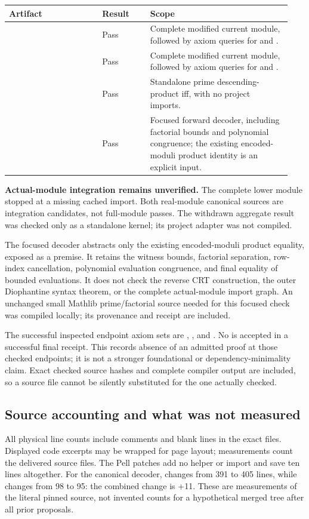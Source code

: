 \begin{longtable}{@{}L{0.31\linewidth}L{0.16\linewidth}L{0.47\linewidth}@{}}
\toprule
Artifact & Result & Scope \\
\midrule
\endhead
{} & Pass & Complete modified current module, followed by axiom queries for  and . \\
 & Pass & Complete modified current module, followed by axiom queries for  and . \\
 & Pass & Standalone prime descending-product iff, with no project imports. \\
 & Pass & Focused forward decoder, including factorial bounds and polynomial congruence; the existing encoded-moduli product identity is an explicit input. \\
\bottomrule
\end{longtable}

\textbf{Actual-module integration remains unverified.} The complete lower  module stopped at a missing cached  import. Both real-module canonical sources are integration candidates, not full-module passes. The withdrawn aggregate result was checked only as a standalone kernel; its project adapter was not compiled.

The focused decoder abstracts only the existing encoded-moduli product equality, exposed as a premise. It retains the witness bounds, factorial separation, row-index cancellation, polynomial evaluation congruence, and final equality of bounded evaluations. It does not check the reverse CRT construction, the outer Diophantine syntax theorem, or the complete actual-module import graph. An unchanged small Mathlib prime/factorial source needed for this focused check was compiled locally; its provenance and receipt are included.

The successful inspected endpoint axiom sets are , , and . No  is accepted in a successful final receipt. This records absence of an admitted proof at those checked endpoints; it is not a stronger foundational or dependency-minimality claim. Exact checked source hashes and complete compiler output are included, so a source file cannot be silently substituted for the one actually checked.

\subsection{Source accounting and what was not measured}
All physical line counts include comments and blank lines in the exact files. Displayed code excerpts may be wrapped for page layout; measurements count the delivered source files. The Pell patches add no helper or import and save ten lines altogether. For the canonical decoder,  changes from 391 to 405 lines, while  changes from 98 to 95: the combined change is +11. These are measurements of the literal pinned source, not invented counts for a hypothetical merged tree after all prior proposals.

